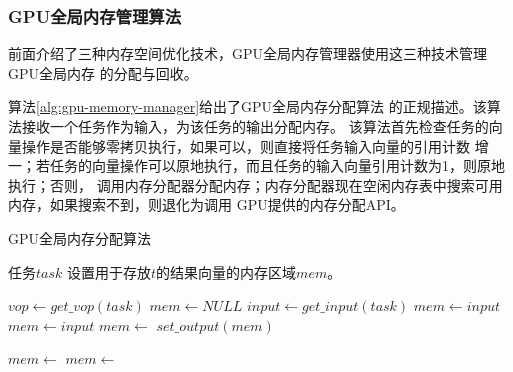 \subsubsection{GPU全局内存管理算法}

前面介绍了三种内存空间优化技术，GPU全局内存管理器使用这三种技术管理GPU全局内存
的分配与回收。

算法\ref{alg:gpu-memory-manager}给出了GPU全局内存分配算法
的正规描述。该算法接收一个任务作为输入，为该任务的输出分配内存。
该算法首先检查任务的向量操作是否能够零拷贝执行，如果可以，则直接将任务输入向量的引用计数
增一；若任务的向量操作可以原地执行，而且任务的输入向量引用计数为1，则原地执行；否则，
调用内存分配器分配内存；内存分配器现在空闲内存表中搜索可用内存，如果搜索不到，则退化为调用
GPU提供的内存分配API。
\begin{algorithm}
  \caption{GPU全局内存分配算法}
  \label{alg:gpu-memory-manager}
  \begin{algorithmic}[1]
    \Require 任务$task$
    \Ensure 设置用于存放$t$的结果向量的内存区域$mem$。

    \State $vop \leftarrow get\_vop(task)$
    \State $mem \leftarrow NULL$
    \State $input \leftarrow get\_input(task)$
    \State {}
    \State $mem \leftarrow input$
    \State $mem \leftarrow input$
    \Else
    \State $mem \leftarrow$ 
    \EndIf
    \State $set\_output(mem)$
    \EndFunction

    \State $mem \leftarrow$ 
    \State $mem \leftarrow$ 
    \EndIf
    \State {}
    \EndFunction
  \end{algorithmic}
\end{algorithm}

